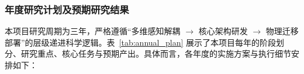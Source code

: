 
















\subsubsection{年度研究计划及预期研究结果}


本项目研究周期为三年，严格遵循“多维感知解耦 $\rightarrow$ 核心架构研发 $\rightarrow$ 物理迁移部署”的层级递进科学逻辑。表~\ref{tab:annual_plan} 展示了本项目每年的阶段划分、研究重点、核心任务与预期产出。具体而言，各年度的实施方案与执行细节安排如下：

